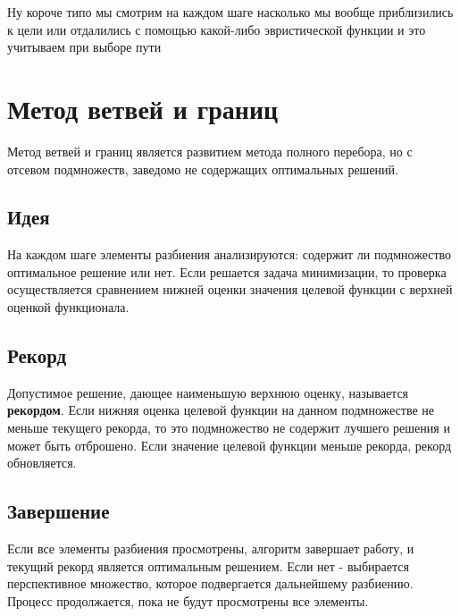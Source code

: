 {Ну короче типо мы смотрим на каждом шаге насколько мы вообще
приблизились к цели или отдалились с помощью какой-либо
эвристической функции и это учитываем при выборе пути

\section*{Метод ветвей и границ}

Метод ветвей и границ является развитием метода полного перебора, но с отсевом подмножеств, заведомо не содержащих оптимальных решений.

\subsection*{Идея}
На каждом шаге элементы разбиения анализируются: содержит ли подмножество оптимальное решение или нет.  
Если решается задача минимизации, то проверка осуществляется сравнением нижней оценки значения целевой функции с верхней оценкой функционала.

\subsection*{Рекорд}
Допустимое решение, дающее наименьшую верхнюю оценку, называется \textbf{рекордом}.  
Если нижняя оценка целевой функции на данном подмножестве не меньше текущего рекорда, то это подмножество не содержит лучшего решения и может быть отброшено.  
Если значение целевой функции меньше рекорда, рекорд обновляется.

\subsection*{Завершение}
Если все элементы разбиения просмотрены, алгоритм завершает работу, и текущий рекорд является оптимальным решением.  
Если нет - выбирается перспективное множество, которое подвергается дальнейшему разбиению.  
Процесс продолжается, пока не будут просмотрены все элементы.


    \newpage
}
